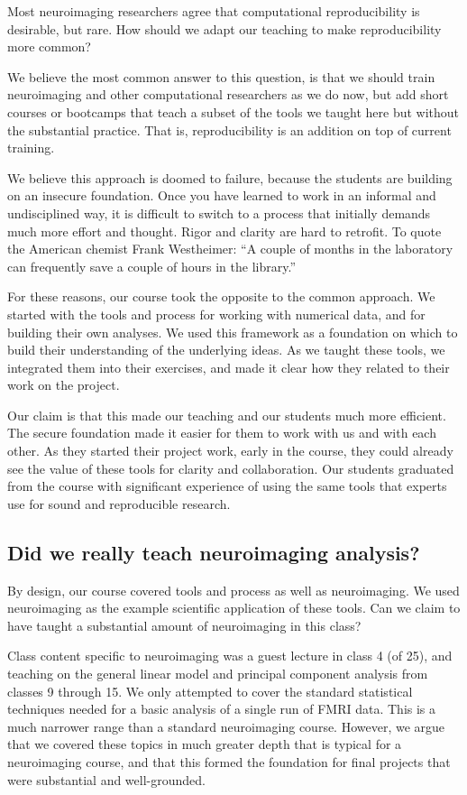 Most neuroimaging researchers agree that computational reproducibility is
desirable, but rare.  How should we adapt our teaching to make reproducibility
more common?

We believe the most common answer to this question, is that we should train
neuroimaging and other computational researchers as we do now, but add short
courses or bootcamps that teach a subset of the tools we taught here but without
the substantial practice.
That is, reproducibility is an addition on top of current training.

We believe this approach is doomed to failure, because the students are
building on an insecure foundation.  Once you have learned to work in an
informal and undisciplined way, it is difficult to switch to a process that
initially demands much more effort and thought.  Rigor and clarity are hard to
retrofit.
To quote the American chemist Frank Westheimer:
``A couple of months in the laboratory can frequently save a couple of hours
in the library.''

For these reasons, our course took the opposite to the common approach. We
started with the tools and process for working with numerical data, and for
building their own analyses. We used this framework as a foundation on which
to build their understanding of the underlying ideas.  As we taught these
tools, we integrated them into their exercises, and made it clear how they
related to their work on the project.

Our claim is that this made our teaching and our students much more efficient.
The secure foundation made it easier for them to work with us and with each
other. As they started their project work, early in the course, they could
already see the value of these tools for clarity and collaboration. Our
students graduated from the course with significant experience of using the
same tools that experts use for sound and reproducible research.

\subsection{Did we really teach neuroimaging analysis?}

By design, our course covered tools and process as well as neuroimaging.  We
used neuroimaging as the example scientific application of these tools.  Can
we claim to have taught a substantial amount of neuroimaging in this class?

Class content specific to neuroimaging was a guest lecture in class 4 (of 25),
and teaching on the general linear model and principal component analysis from
classes 9 through 15.  We only attempted to cover the standard statistical
techniques needed for a basic analysis of a single run of FMRI data.  This is
a much narrower range than a standard neuroimaging course.  However, we argue
that we covered these topics in much greater depth that is typical for a
neuroimaging course, and that this formed the foundation for final projects
that were substantial and well-grounded.

